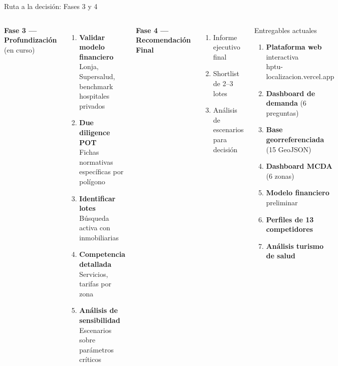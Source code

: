 \documentclass[aspectratio=169, 11pt]{beamer}
\begin{document}
\begin{frame}{Ruta a la decisión: Fases 3 y 4}

\begin{columns}[T]
\textbf{Fase 3 --- Profundización} {\small(en curso)}

\vspace{4pt}
\begin{enumerate}\footnotesize
  \item[\textcolor{teal}{1.}] \textbf{Validar modelo financiero}\\
    {\scriptsize Lonja, Supersalud, benchmark hospitales privados}
  \item[\textcolor{teal}{2.}] \textbf{Due diligence POT}\\
    {\scriptsize Fichas normativas específicas por polígono}
  \item[\textcolor{teal}{3.}] \textbf{Identificar lotes}\\
    {\scriptsize Búsqueda activa con inmobiliarias}
  \item[\textcolor{teal}{4.}] \textbf{Competencia detallada}\\
    {\scriptsize Servicios, tarifas por zona}
  \item[\textcolor{teal}{5.}] \textbf{Análisis de sensibilidad}\\
    {\scriptsize Escenarios sobre parámetros críticos}
\end{enumerate}

\vspace{6pt}
\textbf{Fase 4 --- Recomendación Final}

\vspace{4pt}
\begin{enumerate}\footnotesize
  \item[\textcolor{hptu}{1.}] Informe ejecutivo final
  \item[\textcolor{hptu}{2.}] Shortlist de 2--3 lotes
  \item[\textcolor{hptu}{3.}] Análisis de escenarios para decisión
\end{enumerate}

\begin{block}{\small Entregables actuales}
\footnotesize
\begin{enumerate}
  \item \textbf{Plataforma web} interactiva\\
    {\scriptsize hptu-localizacion.vercel.app}
  \item \textbf{Dashboard de demanda} (6 preguntas)
  \item \textbf{Base georreferenciada} (15 GeoJSON)
  \item \textbf{Dashboard MCDA} (6 zonas)
  \item \textbf{Modelo financiero} preliminar
  \item \textbf{Perfiles de 13 competidores}
  \item \textbf{Análisis turismo de salud}
\end{enumerate}
\end{block}


\end{columns}
\end{frame}
\end{document}
